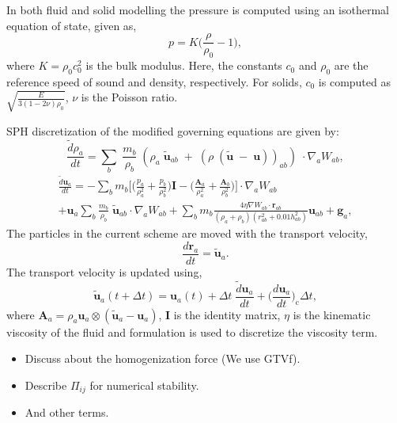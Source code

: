 \documentclass[preprint,12pt]{elsarticle}
\newcommand{\ten}[1]{\ensuremath{\mathbf{#1}}}
\begin{document}
In both fluid and solid modelling the pressure is computed using an
isothermal equation of state, given as,
\begin{equation}
  \label{eq:pressure-equation}
  p = K \bigg(\frac{\rho}{\rho_{0}} - 1 \bigg),
\end{equation}
where $K = \rho_{0} c_0^2$ is the bulk modulus. Here, the constants $c_0$ and
$\rho_0$ are the reference speed of sound and density, respectively. For solids,
$c_0$ is computed as $\sqrt{\frac{E}{3 (1 - 2 \nu)\rho_{0}}}$, $\nu$ is the
Poisson ratio.

SPH discretization of the modified governing equations are given by:
\begin{equation}
  \label{eq:sph-discretization-continuity}
  \frac{\tilde{d}\rho_a}{dt} = \sum_{b} \; \frac{m_b}{\rho_{b}} \; (
  \rho_{a} \; \tilde{\ten{u}}_{ab} \; + \;
  (\rho \; (\tilde{\ten{u}} \; - \;
  \ten{u}))_{ab}) \; \cdot \nabla_{a} W_{ab},
\end{equation}
\begin{multline}
  \label{eq:sph-momentum-fluid}
  \frac{\tilde{d}\ten{u}_{a}}{dt} = - \sum_{b} m_b \bigg[
  \bigg(\frac{p_a}{\rho_a^2} + \frac{p_b}{\rho_b^2}\bigg) \ten{I} -
  \bigg(\frac{\ten{A}_a}{\rho_a^2} + \frac{\ten{A}_b}{\rho_b^2}
  \bigg) \bigg]
  \cdot \nabla_{a} W_{ab} \\
  + \ten{u}_{a} \sum_{b} \frac{m_b}{\rho_{b}} \; \tilde{\ten{u}}_{ab} \cdot
  \nabla_{a} W_{ab} + \sum_{b} m_b \frac{4 \eta \nabla W_{ab}\cdot
    \ten{r}_{ab}}{(\rho_a + \rho_b) (r_{ab}^2 + 0.01 h_{ab}^2)} \ten{u}_{ab} +
  \ten{g}_{a},
\end{multline}
The particles in the current scheme are moved with the transport velocity,
\begin{equation}
  \label{eq:transport_velocity_position_derivative}
  \frac{d\ten{r}_a}{dt} = \ten{\tilde{u}}_a.
\end{equation}
%
The transport velocity is updated using,
\begin{equation}
  \label{eq:transport_velocity}
  \ten{\tilde{u}}_a(t + \Delta t) =\ten{u}_a(t) + \Delta t \; \frac{\tilde{d} \ten{u}_a}{dt} +
  \bigg(\frac{d \ten{u}_{a}}{dt}\bigg)_{\text{c}} \Delta t,
\end{equation}
where $\ten{A}_a = \rho_a \ten{u}_a \otimes (\ten{\tilde{u}}_a - \ten{u}_a)$,
$\ten{I}$ is the identity matrix, $\eta$ is the kinematic viscosity of the
fluid and \citet{morris1997modeling} formulation is used to discretize the
viscosity term.
\begin{itemize}
\item Discuss about the homogenization force (We use GTVf).
\item Describe $\Pi_{ij}$ for numerical stability.
\item And other terms.
\end{itemize}
\end{document}
